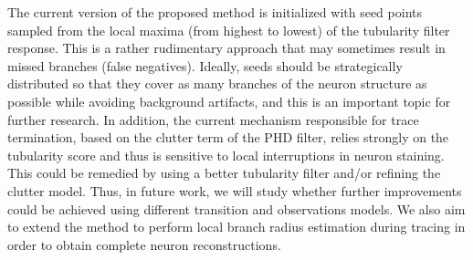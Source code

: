 The current version of the proposed method is initialized with seed points sampled from the local maxima (from highest to lowest) of the tubularity filter response. This is a rather rudimentary approach that may sometimes result in missed branches (false negatives). Ideally, seeds should be strategically distributed so that they cover as many branches of the neuron structure as possible while avoiding background artifacts, and this is an important topic for further research. In addition, the current mechanism responsible for trace termination, based on the clutter term of the PHD filter, relies strongly on the tubularity score and thus is sensitive to local interruptions in neuron staining. This could be remedied by using a better tubularity filter and/or refining the clutter model. Thus, in future work, we will study whether further improvements could be achieved using different transition and observations models. We also aim to extend the method to perform local branch radius estimation during tracing in order to obtain complete neuron reconstructions.

%
%
%
%
